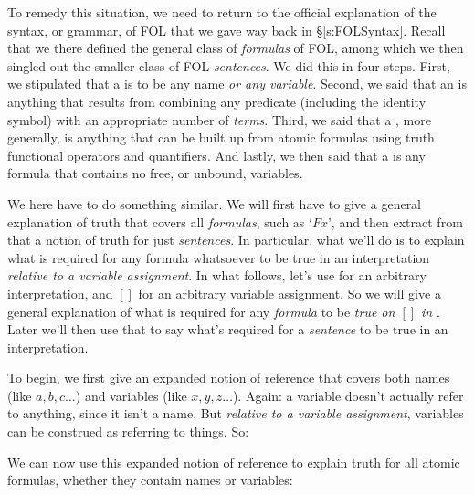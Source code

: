 To remedy this situation, we need to return to the official explanation of the syntax, or grammar, of FOL that we gave way back in \S\ref{s:FOLSyntax}.  Recall that we there defined the general class of \emph{formulas} of FOL, among which we then singled out the smaller class of FOL \emph{sentences}.  We did this in four steps.  First, we stipulated that a  is to be any name \emph{or any variable}.  Second, we said that an  is anything that results from combining any predicate (including the identity symbol) with an appropriate number of \emph{terms}. Third, we said that a , more generally, is anything that can be built up from atomic formulas using truth functional operators and quantifiers.  And lastly, we then said that a  is any formula that contains no free, or unbound, variables.

We here have to do something similar.  We will first have to give a general explanation of truth that covers all \emph{formulas}, such as `$Fx$', and then extract from that a notion of truth for just \emph{sentences}.  In particular, what we'll do is to explain what is required for any formula whatsoever to be true in an interpretation \emph{relative to a variable assignment}.  In what follows, let's use  for an arbitrary interpretation, and $[ ]$ for an arbitrary variable assignment.  So we will give a general explanation of what is required for any \emph{formula} to be \emph{true on $[]$ in  }.  Later we'll then use that to say what's required for a \emph{sentence} to be true in an interpretation.

To begin, we first give an expanded notion of reference that covers both names (like $a, b, c \ldots$) and variables (like $x, y, z \ldots$).  Again: a variable doesn't actually refer to anything, since it isn't a name.  But  \emph{relative to a variable assignment}, variables can be construed as referring to things.  So:

We can now use this expanded notion of reference to explain truth for all atomic formulas, whether they contain names or variables:


